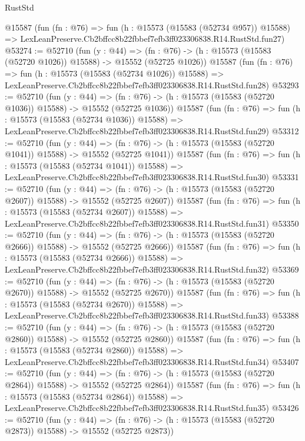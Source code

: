 \begin{lexlean}{RustStd}
\begin{coremodule}
    @15587
    (fun (fn : @76) =>
    fun (h : @15573 (@15583 (@52734 @957)) @15588) =>
    LexLeanPreserve.Cb2bffcc8b22fbbef7efb3ff023306838.R14.RustStd.fun27)
@53274 := @52710
    (fun (y : @44) =>
    (fn : @76) -> (h : @15573 (@15583 (@52720 @1026)) @15588) -> @15552 (@52725 @1026))
    @15587
    (fun (fn : @76) =>
    fun (h : @15573 (@15583 (@52734 @1026)) @15588) =>
    LexLeanPreserve.Cb2bffcc8b22fbbef7efb3ff023306838.R14.RustStd.fun28)
@53293 := @52710
    (fun (y : @44) =>
    (fn : @76) -> (h : @15573 (@15583 (@52720 @1036)) @15588) -> @15552 (@52725 @1036))
    @15587
    (fun (fn : @76) =>
    fun (h : @15573 (@15583 (@52734 @1036)) @15588) =>
    LexLeanPreserve.Cb2bffcc8b22fbbef7efb3ff023306838.R14.RustStd.fun29)
@53312 := @52710
    (fun (y : @44) =>
    (fn : @76) -> (h : @15573 (@15583 (@52720 @1041)) @15588) -> @15552 (@52725 @1041))
    @15587
    (fun (fn : @76) =>
    fun (h : @15573 (@15583 (@52734 @1041)) @15588) =>
    LexLeanPreserve.Cb2bffcc8b22fbbef7efb3ff023306838.R14.RustStd.fun30)
@53331 := @52710
    (fun (y : @44) =>
    (fn : @76) -> (h : @15573 (@15583 (@52720 @2607)) @15588) -> @15552 (@52725 @2607))
    @15587
    (fun (fn : @76) =>
    fun (h : @15573 (@15583 (@52734 @2607)) @15588) =>
    LexLeanPreserve.Cb2bffcc8b22fbbef7efb3ff023306838.R14.RustStd.fun31)
@53350 := @52710
    (fun (y : @44) =>
    (fn : @76) -> (h : @15573 (@15583 (@52720 @2666)) @15588) -> @15552 (@52725 @2666))
    @15587
    (fun (fn : @76) =>
    fun (h : @15573 (@15583 (@52734 @2666)) @15588) =>
    LexLeanPreserve.Cb2bffcc8b22fbbef7efb3ff023306838.R14.RustStd.fun32)
@53369 := @52710
    (fun (y : @44) =>
    (fn : @76) -> (h : @15573 (@15583 (@52720 @2670)) @15588) -> @15552 (@52725 @2670))
    @15587
    (fun (fn : @76) =>
    fun (h : @15573 (@15583 (@52734 @2670)) @15588) =>
    LexLeanPreserve.Cb2bffcc8b22fbbef7efb3ff023306838.R14.RustStd.fun33)
@53388 := @52710
    (fun (y : @44) =>
    (fn : @76) -> (h : @15573 (@15583 (@52720 @2860)) @15588) -> @15552 (@52725 @2860))
    @15587
    (fun (fn : @76) =>
    fun (h : @15573 (@15583 (@52734 @2860)) @15588) =>
    LexLeanPreserve.Cb2bffcc8b22fbbef7efb3ff023306838.R14.RustStd.fun34)
@53407 := @52710
    (fun (y : @44) =>
    (fn : @76) -> (h : @15573 (@15583 (@52720 @2864)) @15588) -> @15552 (@52725 @2864))
    @15587
    (fun (fn : @76) =>
    fun (h : @15573 (@15583 (@52734 @2864)) @15588) =>
    LexLeanPreserve.Cb2bffcc8b22fbbef7efb3ff023306838.R14.RustStd.fun35)
@53426 := @52710
    (fun (y : @44) =>
    (fn : @76) -> (h : @15573 (@15583 (@52720 @2873)) @15588) -> @15552 (@52725 @2873))

\end{coremodule}
\end{lexlean}

